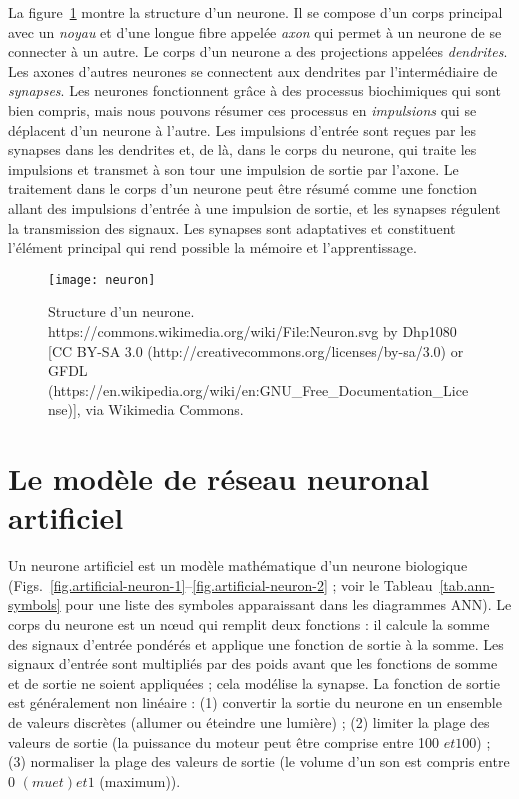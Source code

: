 La figure~\ref{fig.neuron} montre la structure d'un neurone. Il se compose d'un corps principal avec un \emph{noyau} et d'une longue fibre appelée \emph{axon} qui permet à un neurone de se connecter à un autre. Le corps d'un neurone a des projections appelées \emph{dendrites}. Les axones d'autres neurones se connectent aux dendrites par l'intermédiaire de \emph{synapses}. Les neurones fonctionnent grâce à des processus biochimiques qui sont bien compris, mais nous pouvons résumer ces processus en \emph{impulsions} qui se déplacent d'un neurone à l'autre. Les impulsions d'entrée sont reçues par les synapses dans les dendrites et, de là, dans le corps du neurone, qui traite les impulsions et transmet à son tour une impulsion de sortie par l'axone. Le traitement dans le corps d'un neurone peut être résumé comme une fonction allant des impulsions d'entrée à une impulsion de sortie, et les synapses régulent la transmission des signaux. Les synapses sont adaptatives et constituent l'élément principal qui rend possible la mémoire et l'apprentissage.

\begin{figure}
\begin{center}
\texttt{[image: neuron]}
\end{center}
\caption{Structure d'un neurone. https://commons.wikimedia.org/wiki/File:Neuron.svg by Dhp1080 [CC BY-SA 3.0 (http://creativecommons.org/licenses/by-sa/3.0) or GFDL (https://en.wikipedia.org/wiki/en:GNU\_Free\_Documentation\_License)], via Wikimedia Commons.
}\label{fig.neuron}
\end{figure}

\section{Le modèle de réseau neuronal artificiel}\label{s.ann}

Un neurone artificiel est un modèle mathématique d'un neurone biologique (Figs.~\ref{fig.artificial-neuron-1}--\ref{fig.artificial-neuron-2} ; voir le Tableau~\ref{tab.ann-symbols} pour une liste des symboles apparaissant dans les diagrammes ANN). Le corps du neurone est un nœud qui remplit deux fonctions : il calcule la somme des signaux d'entrée pondérés et applique une fonction de sortie à la somme. Les signaux d'entrée sont multipliés par des poids avant que les fonctions de somme et de sortie ne soient appliquées ; cela modélise la synapse. La fonction de sortie est généralement non linéaire : (1) convertir la sortie du neurone en un ensemble de valeurs discrètes (allumer ou éteindre une lumière) ; (2) limiter la plage des valeurs de sortie (la puissance du moteur peut être comprise entre 100 $ et 100 $) ; (3) normaliser la plage des valeurs de sortie (le volume d'un son est compris entre 0 $ (muet) et 1 $ (maximum)).

